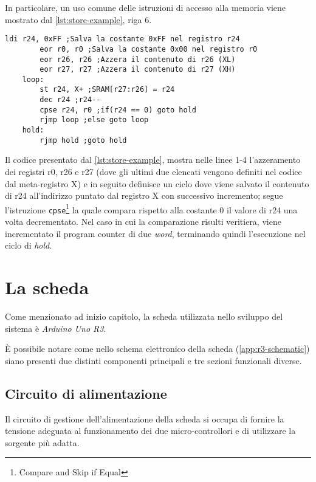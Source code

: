 In particolare, un uso comune delle istruzioni di accesso alla memoria viene mostrato dal \cref{lst:store-example}, riga 6.

\noindent\begin{minipage}{\textwidth}
    \begin{lstlisting}[language=AVR, caption={Esempio di utilizzo dell'istruzione \texttt{st}}, label=lst:store-example]
        ldi r24, 0xFF ;Salva la costante 0xFF nel registro r24
        eor r0, r0 ;Salva la costante 0x00 nel registro r0
        eor r26, r26 ;Azzera il contenuto di r26 (XL)
        eor r27, r27 ;Azzera il contenuto di r27 (XH)
    loop:
        st r24, X+ ;SRAM[r27:r26] = r24
        dec r24 ;r24--
        cpse r24, r0 ;if(r24 == 0) goto hold
        rjmp loop ;else goto loop
    hold:
        rjmp hold ;goto hold

    \end{lstlisting}
\end{minipage}

Il codice presentato dal \cref{lst:store-example}, mostra nelle linee 1-4 l'azzeramento dei registri r0, r26 e r27 (dove gli ultimi due elencati vengono definiti nel codice dal meta-registro X) e in seguito definisce un ciclo dove viene salvato il contenuto di r24 all'indirizzo puntato dal registro X con successivo incremento; segue l'istruzione \texttt{cpse}\footnote{Compare and Skip if Equal} la quale compara rispetto alla costante 0 il valore di r24 una volta decrementato. Nel caso in cui la comparazione risulti veritiera, viene incrementato il program counter di due \textit{word}, terminando quindi l'esecuzione nel ciclo di \textit{hold}.

\section{La scheda}
Come menzionato ad inizio capitolo, la scheda utilizzata nello sviluppo del sistema è \textit{Arduino Uno R3}.

È possibile notare come nello schema elettronico della scheda (\ref{app:r3-schematic}) siano presenti due distinti componenti principali e tre sezioni funzionali diverse.

\subsection{Circuito di alimentazione}

Il circuito di gestione dell'alimentazione della scheda si occupa di fornire la tensione adeguata al funzionamento dei due micro-controllori e di utilizzare la sorgente più adatta.

